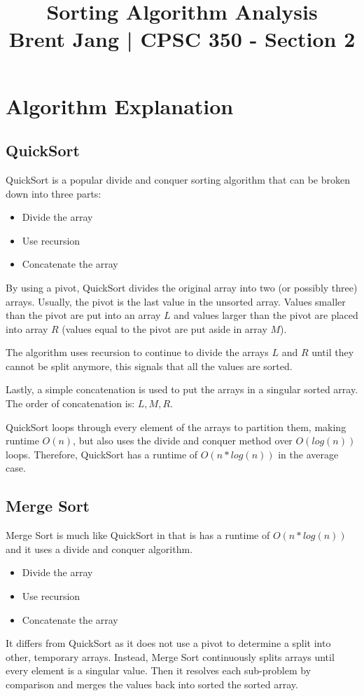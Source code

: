 \documentclass[proceedings]{IEEEtran}
\begin{document}
\title{Sorting Algorithm Analysis\\
{\footnotesize Brent Jang | CPSC 350 - Section 2}
}
\maketitle
\section{Algorithm Explanation}


\subsection{QuickSort}

QuickSort is a popular divide and conquer sorting algorithm that can be broken down into three parts:
\begin{itemize}
\item Divide the array
\item Use recursion 
\item Concatenate the array
\end{itemize}
By using a pivot, QuickSort divides the original array into two (or possibly three) arrays. Usually, the pivot is the last value in the unsorted array. Values smaller than the pivot are put into an array $L$ and values larger than the pivot are placed into array $R$ (values equal to the pivot are put aside in array $M$). 

The algorithm uses recursion to continue to divide the arrays $L$ and $R$ until they cannot be split anymore, this signals that all the values are sorted.

Lastly, a simple concatenation is used to put the arrays in a singular sorted array. The order of concatenation is: $L, M, R$.

QuickSort loops through every element of the arrays to partition them, making runtime $O(n)$, but also uses the divide and conquer method over $O(log(n))$ loops. Therefore, QuickSort has a runtime of $O(n*log(n))$ in the average case.
\subsection{Merge Sort}
Merge Sort is much like QuickSort in that is has a runtime of $O(n*log(n))$ and it uses a divide and conquer algorithm. 
\begin{itemize}
\item Divide the array
\item Use recursion 
\item Concatenate the array
\end{itemize}
It differs from QuickSort as it does not use a pivot to determine a split into other, temporary arrays. Instead, Merge Sort continuously splits arrays until every element is a singular value. Then it resolves each sub-problem by comparison and merges the values back into sorted the sorted array.
\end{document}
